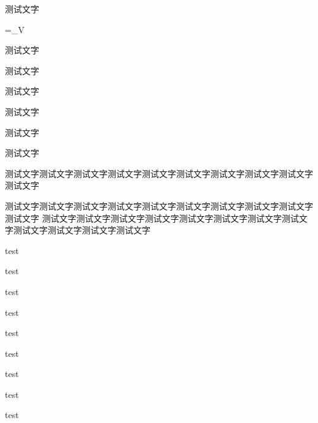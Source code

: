 \begin{Project}
\begin{Definition}[测试文字]
	测试文字
	\begin{flalign}
		\Psi=\int_\Omega{}V
	\end{flalign}
\end{Definition}

\begin{Lemma}
	测试文字
\end{Lemma}

\begin{Theorem}[测试文字]
	测试文字
\end{Theorem}

\begin{Axiom}[测试文字][测试文字]
	测试文字
\end{Axiom}


\begin{Proposition}
	测试文字
\end{Proposition}


\begin{Corollary}
	测试文字
\end{Corollary}

\begin{Lemma}
	测试文字
\end{Lemma}


\begin{Lemma*}[测试文字测试文字]
	测试文字测试文字测试文字测试文字测试文字测试文字测试文字测试文字测试文字测试文字
	
	测试文字测试文字测试文字测试文字测试文字测试文字测试文字测试文字测试文字测试文字
	\zhlipsum
	测试文字测试文字测试文字测试文字测试文字测试文字测试文字测试文字测试文字测试文字测试文字测试文字
	\tcblower
	\zhlipsum[2]
	\zhlipsum[2]
\end{Lemma*}






\begin{UnnumberedItem}[3]
\item test
\item test
\item test
\item test
\item test
\item test
\item test
\item test
\item test
\end{UnnumberedItem}


\end{Project}
